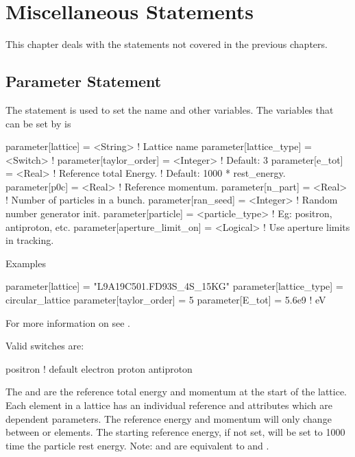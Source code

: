 \chapter{Miscellaneous Statements}

This chapter deals with the statements not covered in the previous chapters.

\section{Parameter Statement}
\label{s:param}


The  statement is used to set the  name and
other variables.  The variables that can be set by  is
\begin{example}
  parameter[lattice]      = <String>        ! Lattice name 
  parameter[lattice_type] = <Switch>        ! 
  parameter[taylor_order] = <Integer>       ! Default: 3
  parameter[e_tot]        = <Real>          ! Reference total Energy. 
                                            !      Default: 1000 * rest_energy.
  parameter[p0c]          = <Real>          ! Reference momentum.
  parameter[n_part]       = <Real>          ! Number of particles in a bunch.
  parameter[ran_seed]     = <Integer>       ! Random number generator init.
  parameter[particle]     = <particle_type> ! Eg: positron, antiproton, etc.
  parameter[aperture_limit_on] = <Logical>  ! Use aperture limits in tracking.
\end{example}

\noindent
Examples
\begin{example}
  parameter[lattice]      = "L9A19C501.FD93S_4S_15KG"
  parameter[lattice_type] = circular_lattice
  parameter[taylor_order] = 5
  parameter[E_tot]  = 5.6e9    ! eV
\end{example}

For more information on  see .

Valid  switches are:
\begin{example}
  positron  ! default
  electron
  proton
  antiproton
\end{example}

The  and  are the reference
total energy and momentum at the start of the lattice.  Each element
in a lattice has an individual reference  and  attributes
which are dependent parameters. The reference energy and momentum will only
change between  or  elements. The starting
reference energy, if not set, will be set to 1000 time the particle
rest energy.  Note:  and  are
equivalent to  and .

